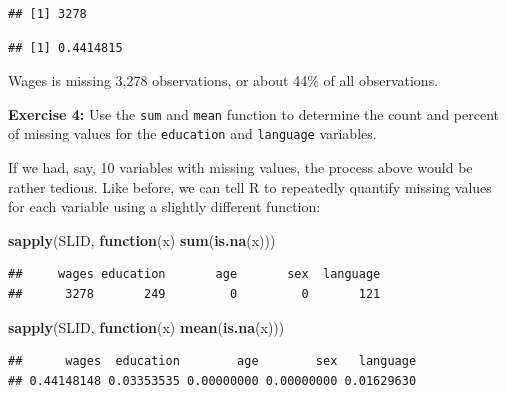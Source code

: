 \documentclass[
]{book}
\newenvironment{Shaded}{\begin{snugshade}}{\end{snugshade}}
\newcommand{\ControlFlowTok}[1]{\textcolor[rgb]{0.13,0.29,0.53}{\textbf{#1}}}
\newcommand{\KeywordTok}[1]{\textcolor[rgb]{0.13,0.29,0.53}{\textbf{#1}}}
\newcommand{\NormalTok}[1]{#1}
\newcommand{\OperatorTok}[1]{\textcolor[rgb]{0.81,0.36,0.00}{\textbf{#1}}}
\newenvironment{learncheck}%
{%
  \par\vspace{\baselineskip}\noindent 
  \color{Exercise}\begin{itshape}%
  \par\vspace{\baselineskip}\noindent\ignorespaces 
}%
{%
  \end{itshape}\ignorespacesafterend 
}
\begin{document}
\begin{verbatim}
## [1] 3278
\end{verbatim}

\begin{Shaded}
\end{Shaded}

\begin{verbatim}
## [1] 0.4414815
\end{verbatim}

Wages is missing 3,278 observations, or about 44\% of all observations.

\begin{learncheck}
\textbf{Exercise 4:} Use the \texttt{sum} and \texttt{mean} function to
determine the count and percent of missing values for the
\texttt{education} and \texttt{language} variables.
\end{learncheck}

If we had, say, 10 variables with missing values, the process above would be rather tedious. Like before, we can tell R to repeatedly quantify missing values for each variable using a slightly different function:

\begin{Shaded}
\begin{Highlighting}[]
\KeywordTok{sapply}\NormalTok{(SLID, }\ControlFlowTok{function}\NormalTok{(x) }\KeywordTok{sum}\NormalTok{(}\KeywordTok{is.na}\NormalTok{(x)))}
\end{Highlighting}
\end{Shaded}

\begin{verbatim}
##     wages education       age       sex  language 
##      3278       249         0         0       121
\end{verbatim}

\begin{Shaded}
\begin{Highlighting}[]
\KeywordTok{sapply}\NormalTok{(SLID, }\ControlFlowTok{function}\NormalTok{(x) }\KeywordTok{mean}\NormalTok{(}\KeywordTok{is.na}\NormalTok{(x)))}
\end{Highlighting}
\end{Shaded}

\begin{verbatim}
##      wages  education        age        sex   language 
## 0.44148148 0.03353535 0.00000000 0.00000000 0.01629630
\end{verbatim}
\end{document}
